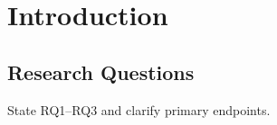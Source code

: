 \section{Introduction}
\subsection{Research Questions}
State RQ1--RQ3 and clarify primary endpoints.
